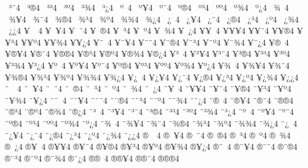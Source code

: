 {^^a0^^b3^^a84
^^a0^^b3^^ae4
^^a0^^b3^^b34
^^a0^^b3^^ba4
^^a0^^b3^^be4
^^a0^^b3^^bf4
^^a0^^ba^^a04
^^a0^^ba^^a54
^^a0^^ba^^a84
^^a0^^ba^^ae4
^^a0^^ba^^b34
^^a0^^ba^^ba4
^^a0^^ba^^be4
^^a0^^ba^^bf4
^^a0^^be^^a04
^^a0^^be^^a54
^^a0^^be^^a84
^^a0^^be^^ae4
^^a0^^be^^b34
^^a0^^be^^ba4
^^a0^^be^^be4
^^a0^^be^^bf4
^^a0^^bf^^a04
^^a0^^bf^^a54
^^a0^^bf^^a84
^^a0^^bf^^ae4
^^a0^^bf^^b34
^^a0^^bf^^ba4
^^a0^^bf^^be4
^^a0^^bf^^bf4
^^a5^^a0^^a04
^^a5^^a0^^a54
^^a5^^a0^^a84
^^a5^^a0^^ae4
^^a5^^a0^^b34
^^a5^^a0^^ba4
^^a5^^a0^^be4
^^a5^^a0^^bf4
^^a5^^a5^^a04
^^a5^^a5^^a54
^^a5^^a5^^a84
^^a5^^a5^^ae4
^^a5^^a5^^b34
^^a5^^a5^^ba4
^^a5^^a5^^be4
^^a5^^a5^^bf4
^^a5^^a8^^a04
^^a5^^a8^^a54
^^a5^^a8^^a84
^^a5^^a8^^ae4
^^a5^^a8^^b34
^^a5^^a8^^ba4
^^a5^^a8^^be4
^^a5^^a8^^bf4
^^a5^^ae^^a04
^^a5^^ae^^a54
^^a5^^ae^^a84
^^a5^^ae^^ae4
^^a5^^ae^^b34
^^a5^^ae^^ba4
^^a5^^ae^^be4
^^a5^^ae^^bf4
^^a5^^b3^^a04
^^a5^^b3^^a54
^^a5^^b3^^a84
^^a5^^b3^^ae4
^^a5^^b3^^b34
^^a5^^b3^^ba4
^^a5^^b3^^be4
^^a5^^b3^^bf4
^^a5^^ba^^a04
^^a5^^ba^^a54
^^a5^^ba^^a84
^^a5^^ba^^ae4
^^a5^^ba^^b34
^^a5^^ba^^ba4
^^a5^^ba^^be4
^^a5^^ba^^bf4
^^a5^^be^^a04
^^a5^^be^^a54
^^a5^^be^^a84
^^a5^^be^^ae4
^^a5^^be^^b34
^^a5^^be^^ba4
^^a5^^be^^be4
^^a5^^be^^bf4
^^a5^^bf^^a04
^^a5^^bf^^a54
^^a5^^bf^^a84
^^a5^^bf^^ae4
^^a5^^bf^^b34
^^a5^^bf^^ba4
^^a5^^bf^^be4
^^a5^^bf^^bf4
^^a8^^a0^^a04
^^a8^^a0^^a54
^^a8^^a0^^a84
^^a8^^a0^^ae4
^^a8^^a0^^b34
^^a8^^a0^^ba4
^^a8^^a0^^be4
^^a8^^a0^^bf4
^^a8^^a5^^a04
^^a8^^a5^^a54
^^a8^^a5^^a84
^^a8^^a5^^ae4
^^a8^^a5^^b34
^^a8^^a5^^ba4
^^a8^^a5^^be4
^^a8^^a5^^bf4
^^a8^^a8^^a04
^^a8^^a8^^a54
^^a8^^a8^^a84
^^a8^^a8^^ae4
^^a8^^a8^^b34
^^a8^^a8^^ba4
^^a8^^a8^^be4
^^a8^^a8^^bf4
^^a8^^ae^^a04
^^a8^^ae^^a54
^^a8^^ae^^a84
^^a8^^ae^^ae4
^^a8^^ae^^b34
^^a8^^ae^^ba4
^^a8^^ae^^be4
^^a8^^ae^^bf4
^^a8^^b3^^a04
^^a8^^b3^^a54
^^a8^^b3^^a84
^^a8^^b3^^ae4
^^a8^^b3^^b34
^^a8^^b3^^ba4
^^a8^^b3^^be4
^^a8^^b3^^bf4
^^a8^^ba^^a04
^^a8^^ba^^a54
^^a8^^ba^^a84
^^a8^^ba^^ae4
^^a8^^ba^^b34
^^a8^^ba^^ba4
^^a8^^ba^^be4
^^a8^^ba^^bf4
^^a8^^be^^a04
^^a8^^be^^a54
^^a8^^be^^a84
^^a8^^be^^ae4
^^a8^^be^^b34
^^a8^^be^^ba4
^^a8^^be^^be4
^^a8^^be^^bf4
^^a8^^bf^^a04
^^a8^^bf^^a54
^^a8^^bf^^a84
^^a8^^bf^^ae4
^^a8^^bf^^b34
^^a8^^bf^^ba4
^^a8^^bf^^be4
^^a8^^bf^^bf4
^^ae^^a0^^a04
^^ae^^a0^^a54
^^ae^^a0^^a84
^^ae^^a0^^ae4
^^ae^^a0^^b34
^^ae^^a0^^ba4
^^ae^^a0^^be4
^^ae^^a0^^bf4
^^ae^^a5^^a04
^^ae^^a5^^a54
^^ae^^a5^^a84
^^ae^^a5^^ae4
^^ae^^a5^^b34
^^ae^^a5^^ba4
^^ae^^a5^^be4
^^ae^^a5^^bf4
^^ae^^a8^^a04
^^ae^^a8^^a54
^^ae^^a8^^a84
^^ae^^a8^^ae4
^^ae^^a8^^b34
^^ae^^a8^^ba4
^^ae^^a8^^be4
^^ae^^a8^^bf4
^^ae^^ae^^a04
^^ae^^ae^^a54
^^ae^^ae^^a84
^^ae^^ae^^ae4
}
